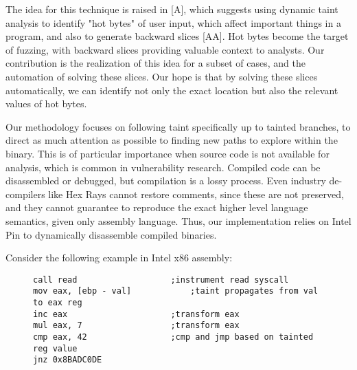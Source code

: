 \documentclass[11pt,expanded,copyright]{fsuthesis}
\begin{document}
The idea for this technique is raised in [A], which suggests using dynamic taint analysis to identify "hot bytes" of user input, which affect important things in a program, and also to generate backward slices [AA]. Hot bytes become the target of fuzzing, with backward slices providing valuable context to analysts. Our contribution is the realization of this idea for a subset of cases, and the automation of solving these slices. Our hope is that by solving these slices automatically, we can identify not only the exact location but also the relevant values of hot bytes. 

Our methodology focuses on following taint specifically up to tainted branches, to direct as much attention as possible to finding new paths to explore within the binary. This is of particular importance when source code is not available for analysis, which is common in vulnerability research. Compiled code can be disassembled or debugged, but compilation is a lossy process. Even industry de-compilers like Hex Rays cannot restore comments, since these are not preserved, and they cannot guarantee to reproduce the exact higher level language semantics, given only assembly language. Thus, our implementation relies on Intel Pin to dynamically disassemble compiled binaries.

Consider the following example in Intel x86 assembly:
\begin{figure}
\begin{lstlisting}[style=asmstyle]
call read					;instrument read syscall
mov eax, [ebp - val]	        ;taint propagates from val to eax reg
inc eax						;transform eax
mul eax, 7					;transform eax
cmp eax, 42					;cmp and jmp based on tainted reg value
jnz 0x8BADC0DE
\end{lstlisting}
\end{figure}
\end{document}
